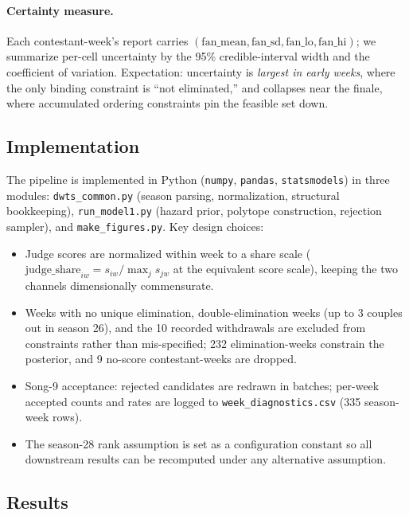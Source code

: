 \documentclass[11pt]{article}
\begin{document}
\paragraph{Certainty measure.} Each contestant-week's report carries
$(\text{fan\_mean}, \text{fan\_sd}, \text{fan\_lo}, \text{fan\_hi})$; we
summarize per-cell uncertainty by the 95\% credible-interval width and the
coefficient of variation. Expectation: uncertainty is \emph{largest in
early weeks}, where the only binding constraint is ``not eliminated,'' and
collapses near the finale, where accumulated ordering constraints pin the
feasible set down.

\subsection{Implementation}

The pipeline is implemented in Python (\texttt{numpy}, \texttt{pandas},
\texttt{statsmodels}) in three modules: \texttt{dwts\_common.py} (season
parsing, normalization, structural bookkeeping), \texttt{run\_model1.py}
(hazard prior, polytope construction, rejection sampler), and
\texttt{make\_figures.py}. Key design choices:

\begin{itemize}
\item Judge scores are normalized within week to a share scale
($\text{judge\_share}_{iw} = s_{iw} / \max_j s_{jw}$ at the equivalent
score scale), keeping the two channels dimensionally commensurate.
\item Weeks with no unique elimination, double-elimination weeks
(up to 3 couples out in season 26), and the 10 recorded withdrawals are
excluded from constraints rather than mis-specified; 232 elimination-weeks
constrain the posterior, and 9 no-score contestant-weeks are dropped.
\item Song-9 acceptance: rejected candidates are redrawn in batches;
per-week accepted counts and rates are logged to
\texttt{week\_diagnostics.csv} (335 season-week rows).
\item The season-28 rank assumption is set as a configuration constant so
all downstream results can be recomputed under any alternative assumption.
\end{itemize}

\subsection{Results}
\end{document}
